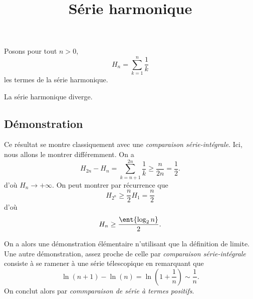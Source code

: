 \documentclass[fontsize=12pt,twoside=false,parskip=half]{scrartcl}
\title{Série harmonique}
\date{}
\author{}
\begin{document}
\maketitle
    Posons pour tout $n > 0$,
    \[
        H_n  = \sum_{k = 1}^{n} \frac{1}{k}
    \]
    les termes de la série harmonique.
   \begin{Theoreme}
    La série harmonique diverge.
   \end{Theoreme}
   \subsection{Démonstration}
      Ce résultat se montre classiquement avec une \emph{comparaison série-intégrale}.
      Ici, nous allons le montrer différemment. 
      On a
      \[
        H_{2n} - H_n = \sum_{k = n + 1}^{2n} \frac{1}{k} \geq \frac{n}{2n} = \frac{1}{2}.
      \]
      d'où $H_n \to +\infty$. On peut montrer par récurrence que 
      \[    
        H_{2^n} \geq \frac{n}{2} H_1 = \frac{n}{2}
      \]
      d'où
      \[
        H_n \geq \frac{\ent{\log_2 n}}{2}.
      \]
      
      On a alors une démonstration élémentaire n'utilisant que la définition de limite.
      Une autre démonstration, assez proche de celle par \emph{comparaison série-intégrale}
      consiste à se ramener à une série télescopique en remarquant que
      \[
        \ln\left(n + 1\right) - \ln\left(n \right) = \ln\left(1 + \frac{1}{n}\right) \sim \frac{1}{n}.
      \]
      On conclut alors par \emph{commparaison de série à termes positifs}.
\end{document}
